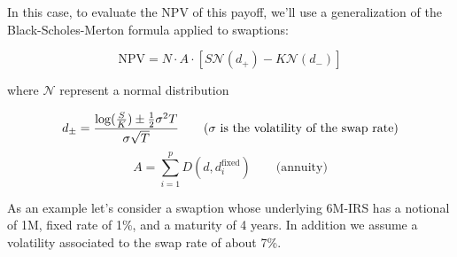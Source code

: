 \documentclass[11pt]{article}
\begin{document}
In this case, to evaluate the NPV of this payoff, we'll use a
generalization of the Black-Scholes-Merton formula applied to swaptions:

\[\mathrm{NPV} = N\cdot A\cdot [S \mathcal{N}(d_+) - K\mathcal{N}(d_-)]\]

where \(\mathcal{N}\) represent a normal distribution

\[d_{\pm} = \frac{\mathrm{log}(\frac{S}{K}) \pm \frac{1}{2}\sigma^{2}T}{\sigma\sqrt{T}}\qquad(\sigma~\textrm{is the volatility of the swap rate})\\\]
\[A =\sum_{i=1}^{p}D(d, d_{i}^{\mathrm{fixed}})\qquad\mathrm{(annuity})\]

As an example let's consider a swaption whose underlying 6M-IRS has a
notional of 1M, fixed rate of 1\%, and a maturity of 4 years. In
addition we assume a volatility associated to the swap rate of about
7\%.
\end{document}
